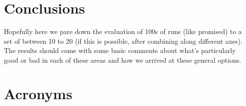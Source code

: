 \section{Conclusions}
Hopefully here we pare down the evaluation of 100s of runs (like promised) to a set of between 10 to 20 (if this is possible, after combining along different axes). 
The results should come with some basic comments about what's particularly good or bad in each of these areas and how we arrived at these general options. 


\section{Acronyms} \label{sec:acronyms}

